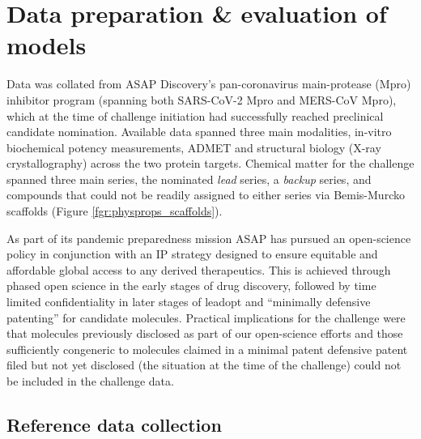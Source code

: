 \documentclass[journal=jcim,manuscript=article]{achemso}
\begin{document}
\section{Data preparation \& evaluation of models}

Data was collated from ASAP Discovery’s pan-coronavirus main-protease (Mpro) inhibitor program (spanning both SARS-CoV-2 Mpro and MERS-CoV Mpro), which at the time of challenge initiation had successfully reached preclinical candidate nomination. Available data spanned three main modalities, in-vitro biochemical potency measurements, ADMET and structural biology (X-ray crystallography) across the two protein targets. Chemical matter for the challenge spanned three main series, the nominated \textit{lead} series, a \textit{backup} series, and compounds that could not be readily assigned to either series via Bemis-Murcko scaffolds\cite{bemis_murcko_1996} (Figure \ref{fgr:physprops_scaffolds}). 

As part of its pandemic preparedness mission ASAP has pursued an open-science policy in conjunction with an IP strategy designed to ensure equitable and affordable global access to any derived therapeutics. This is achieved through phased open science in the early stages of drug discovery, followed by time limited confidentiality in later stages of leadopt and “minimally defensive patenting” for candidate molecules\cite{griffen_2024}. Practical implications for the challenge were that molecules previously disclosed as part of our open-science efforts and those sufficiently congeneric to molecules claimed in a minimal patent defensive patent filed but not yet disclosed (the situation at the time of the challenge) could not be included in the challenge data.


\subsection{Reference data collection}
\end{document}
